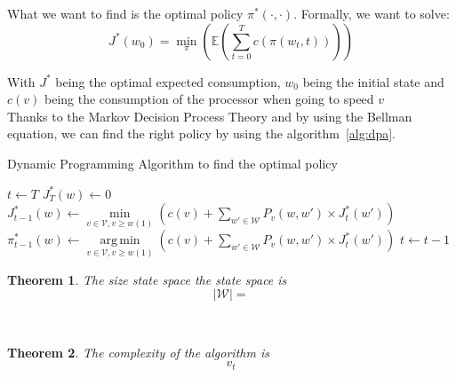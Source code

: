 \documentclass[
10pt, %
a4paper, %
oneside, %
headinclude,footinclude, %
BCOR5mm, %
]{scrartcl}
\DeclareMathOperator*{\argmin}{arg\,min}
\newcommand{\V}{\mathcal{V}}
\newcommand{\W}{\mathcal{W}}
\newtheorem{theo}{Theorem}
\begin{document}
What we want to find is the optimal policy $\pi^*(\cdot,\cdot)$.
Formally, we want to solve:
\begin{equation}
  \label{eq:rightpolicy}
  J^*(w_0)=\min_\pi \left(\mathbb{E}\left(\sum_{t=0}^Tc(\pi(w_t,t))\right)\right)
\end{equation}

With $J^*$ being the optimal expected consumption, $w_0$ being the
initial state and $c(v)$ being the consumption of the processor when
going to speed $v$\\

Thanks to the Markov Decision Process Theory and by using the Bellman
equation, we can find the right policy by using the
algorithm~\ref{alg:dpa}.\\

\begin{algorithm}
  \caption{Dynamic Programming Algorithm to find the optimal policy}
  \label{alg:dpa}
  \begin{algorithmic}
    \STATE $t\leftarrow T$
    \FORALL{$w\in\W$}
    \STATE $J_T^*(w)\leftarrow 0$
    \ENDFOR
    \FORALL{$w\in\W$}
    \STATE $J_{t-1}^*(w)\leftarrow
    \min\limits_{v\in\V,v\geq
      w(1)}\left(c(v)+\sum\limits_{w'\in\W}P_v(w,w')\times
      J_t^*(w')\right)$
    \STATE $\pi_{t-1}^*(w)\leftarrow
    \argmin\limits_{v\in\V,v\geq
      w(1)}\left(c(v)+\sum\limits_{w'\in\W}P_v(w,w')\times
      J_t^*(w')\right)$
    \ENDFOR
    \STATE $t\leftarrow t-1$
    \ENDWHILE
  \end{algorithmic}
  
\end{algorithm}

\begin{theo}
  The size state space the state space is
  \[
    |\W|=
  \]
\end{theo}
\\

\begin{theo}
  The complexity of the algorithm is
  \[
    v_t
  \]
\end{theo}
\end{document}
